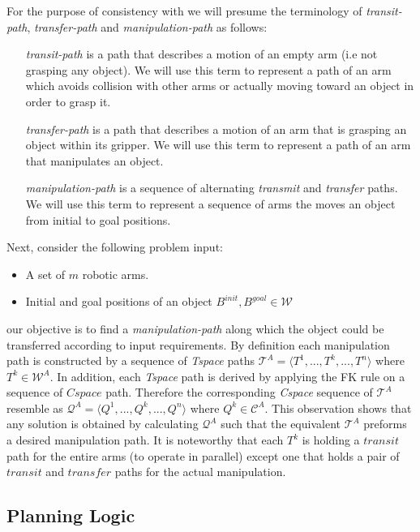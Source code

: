 For the purpose of consistency with \cite{koga1994multi,koga1992} we will presume the terminology of \textit{transit-path}, \textit{transfer-path} and \textit{manipulation-path} as follows:
\begin{itemize}
\item[\textit{transit-path}] is a path that describes a motion of an empty arm (i.e not grasping any object). We will use this term to represent a path of an arm which avoids collision with other arms or actually moving toward an object in order to grasp it.

\item[\textit{transfer-path}] is a path that describes a motion of an arm that is grasping an object within its gripper. We will use this term to represent a path of an arm that manipulates an object.

\item[\textit{manipulation-path}]  is a sequence of alternating \textit{transmit} and \textit{transfer} paths. We will use this term to represent a sequence of arms the moves an object from initial to goal positions.

\end{itemize}
Next, consider the following problem input:


\begin{itemize}
\item A set of $m$ robotic arms. 
\item Initial and goal positions of an object $B^{init},B^{goal} \in \mathcal{W}$
\end{itemize}
our objective is to find a \textit{manipulation-path} along which the object could be transferred according to input requirements. By definition each manipulation path is constructed by a sequence of \textit{Tspace} paths $\mathcal{T}^A=\langle T^{1},...,T^k, ...,T^n\rangle$ where $T^k \in \mathcal{W}^A$. In addition, each \textit{Tspace} path is derived by applying the FK rule on a sequence of $Cspace$ path. Therefore the corresponding \textit{Cspace} sequence of $\mathcal{T}^A$ resemble as $\mathcal{Q}^A=\langle Q^{1},...,Q^k, ...,Q^n\rangle$ where $Q^k \in \mathcal{C}^A$. This observation shows that any solution is obtained by calculating $\mathcal{Q}^A$ such that the equivalent $\mathcal{T}^A$ preforms a desired manipulation path. It is noteworthy that each $T^k$ is holding a $transit$ path for the entire arms (to operate in parallel) except one that holds a pair of $transit$ and $transfer$ paths for the actual manipulation.


\subsection{Planning Logic}

